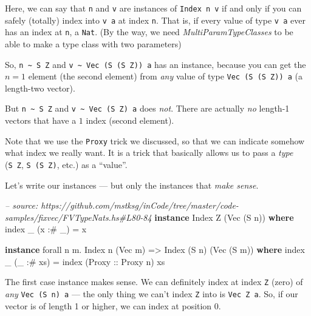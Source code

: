 \documentclass[]{article}
\newenvironment{Shaded}{}{}
\newcommand{\KeywordTok}[1]{\textcolor[rgb]{0.00,0.44,0.13}{\textbf{{#1}}}}
\newcommand{\DataTypeTok}[1]{\textcolor[rgb]{0.56,0.13,0.00}{{#1}}}
\newcommand{\CommentTok}[1]{\textcolor[rgb]{0.38,0.63,0.69}{\textit{{#1}}}}
\newcommand{\OtherTok}[1]{\textcolor[rgb]{0.00,0.44,0.13}{{#1}}}
\newcommand{\FunctionTok}[1]{\textcolor[rgb]{0.02,0.16,0.49}{{#1}}}
\newcommand{\NormalTok}[1]{{#1}}
\begin{document}
Here, we can say that \texttt{n} and \texttt{v} are instances of
\texttt{Index\ n\ v} if and only if you can safely (totally) index into
\texttt{v\ a} at index \texttt{n}. That is, if every value of type
\texttt{v\ a} ever has an index at \texttt{n}, a \texttt{Nat}. (By the
way, we need \emph{MultiParamTypeClasses} to be able to make a type
class with two parameters)

So, \texttt{n\ \textasciitilde{}\ S\ Z} and
\texttt{v\ \textasciitilde{}\ Vec\ (S\ (S\ Z))\ a} has an instance,
because you can get the \(n = 1\) element (the second element) from
\emph{any} value of type \texttt{Vec\ (S\ (S\ Z))\ a} (a length-two
vector).

But \texttt{n\ \textasciitilde{}\ S\ Z} and
\texttt{v\ \textasciitilde{}\ Vec\ (S\ Z)\ a} does \emph{not}. There are
actually \emph{no} length-1 vectors that have a \(1\) index (second
element).

Note that we use the \texttt{Proxy} trick we discussed, so that we can
indicate somehow what index we really want. It is a trick that basically
allows us to pass a \emph{type} (\texttt{S\ Z}, \texttt{S\ (S\ Z)},
etc.) as a ``value''.

Let's write our instances --- but only the instances that \emph{make
sense}.

\begin{Shaded}
\begin{Highlighting}[]
\CommentTok{-- source: https://github.com/mstksg/inCode/tree/master/code-samples/fixvec/FVTypeNats.hs#L80-84}
\KeywordTok{instance} \DataTypeTok{Index} \DataTypeTok{Z} \NormalTok{(}\DataTypeTok{Vec} \NormalTok{(}\DataTypeTok{S} \NormalTok{n)) }\KeywordTok{where}
    \NormalTok{index _ (x }\FunctionTok{:#} \NormalTok{_) }\FunctionTok{=} \NormalTok{x}

\KeywordTok{instance} \NormalTok{forall n m}\FunctionTok{.} \DataTypeTok{Index} \NormalTok{n (}\DataTypeTok{Vec} \NormalTok{m) }\OtherTok{=>} \DataTypeTok{Index} \NormalTok{(}\DataTypeTok{S} \NormalTok{n) (}\DataTypeTok{Vec} \NormalTok{(}\DataTypeTok{S} \NormalTok{m)) }\KeywordTok{where}
    \NormalTok{index _ (_ }\FunctionTok{:#} \NormalTok{xs) }\FunctionTok{=} \NormalTok{index (}\DataTypeTok{Proxy}\OtherTok{ ::} \DataTypeTok{Proxy} \NormalTok{n) xs}
\end{Highlighting}
\end{Shaded}

The first case instance makes sense. We can definitely index at index
\texttt{Z} (zero) of \emph{any} \texttt{Vec\ (S\ n)\ a} --- the only
thing we can't index \texttt{Z} into is \texttt{Vec\ Z\ a}. So, if our
vector is of length 1 or higher, we can index at position 0.
\end{document}
